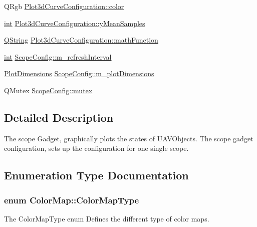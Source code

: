 \begin{DoxyCompactItemize}
Q\-Rgb \hyperlink{group___scope_plugin_gab12e6f531f6e4242ccbb585aec40b245}{Plot3d\-Curve\-Configuration\-::color}
\item 
\hyperlink{ioapi_8h_a787fa3cf048117ba7123753c1e74fcd6}{int} \hyperlink{group___scope_plugin_ga917daaa3cc944ff8bd9e8ae6ed1cfc3b}{Plot3d\-Curve\-Configuration\-::y\-Mean\-Samples}
\item 
\hyperlink{group___u_a_v_objects_plugin_gab9d252f49c333c94a72f97ce3105a32d}{Q\-String} \hyperlink{group___scope_plugin_ga344f163230a632804af76085d5ed4ae1}{Plot3d\-Curve\-Configuration\-::math\-Function}
\item 
\hyperlink{ioapi_8h_a787fa3cf048117ba7123753c1e74fcd6}{int} \hyperlink{group___scope_plugin_gab29cf33842cdb51f7eba8bfccc93158e}{Scope\-Config\-::m\-\_\-refresh\-Interval}
\item 
\hyperlink{group___scope_plugin_ga51d68dee7f98e408c8929a70cc78931d}{Plot\-Dimensions} \hyperlink{group___scope_plugin_ga5e011996b5bbb5da0ee8b193bb5073df}{Scope\-Config\-::m\-\_\-plot\-Dimensions}
\item 
Q\-Mutex \hyperlink{group___scope_plugin_ga482a0dd2b656ddf480def36bacca8aac}{Scope\-Config\-::mutex}
\end{DoxyCompactItemize}


\subsection{Detailed Description}
The scope Gadget, graphically plots the states of U\-A\-V\-Objects. The scope gadget configuration, sets up the configuration for one single scope.

\subsection{Enumeration Type Documentation}
\hypertarget{group___scope_plugin_ga7f4f087196557757ec8061242e795031}{
\subsubsection[{Color\-Map\-Type}]{\setlength{\rightskip}{0pt plus 5cm}enum {\bf Color\-Map\-::\-Color\-Map\-Type}}}\label{group___scope_plugin_ga7f4f087196557757ec8061242e795031}


The Color\-Map\-Type enum Defines the different type of color maps. 

